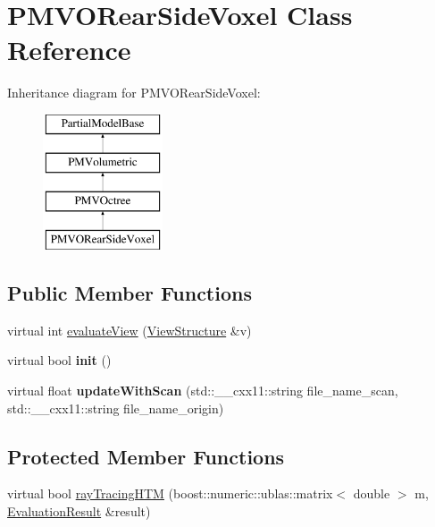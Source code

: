 \hypertarget{classPMVORearSideVoxel}{}\section{P\+M\+V\+O\+Rear\+Side\+Voxel Class Reference}
\label{classPMVORearSideVoxel}
Inheritance diagram for P\+M\+V\+O\+Rear\+Side\+Voxel\+:\begin{figure}[H]
\begin{center}
\leavevmode
\includegraphics[height=4.000000cm]{classPMVORearSideVoxel}
\end{center}
\end{figure}
\subsection*{Public Member Functions}
\begin{DoxyCompactItemize}
\item 
virtual int \hyperlink{classPMVORearSideVoxel_abfbe9be1007d7d7fe7434031c1d96ad1}{evaluate\+View} (\hyperlink{classViewStructure}{View\+Structure} \&v)
\item 
virtual bool {\bfseries init} ()\hypertarget{classPMVORearSideVoxel_a4ca7c445000eca5a6adffb697144883f}{}\label{classPMVORearSideVoxel_a4ca7c445000eca5a6adffb697144883f}

\item 
virtual float {\bfseries update\+With\+Scan} (std\+::\+\_\+\+\_\+cxx11\+::string file\+\_\+name\+\_\+scan, std\+::\+\_\+\+\_\+cxx11\+::string file\+\_\+name\+\_\+origin)\hypertarget{classPMVORearSideVoxel_a38a6f20a57c209e87f74f5b4859271f7}{}\label{classPMVORearSideVoxel_a38a6f20a57c209e87f74f5b4859271f7}

\end{DoxyCompactItemize}
\subsection*{Protected Member Functions}
\begin{DoxyCompactItemize}
\item 
virtual bool \hyperlink{classPMVORearSideVoxel_afd9b08599913cf32cbc315cb210f4924}{ray\+Tracing\+H\+TM} (boost\+::numeric\+::ublas\+::matrix$<$ double $>$ m, \hyperlink{classEvaluationResult}{Evaluation\+Result} \&result)
\end{DoxyCompactItemize}
